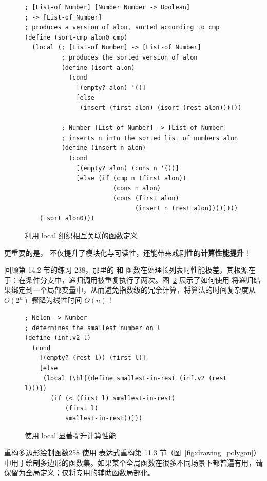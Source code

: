 \begin{figure}[htbp]
  \centering
\begin{lstlisting}[language=BSL, basicstyle=\scriptsize\ttfamily]
; [List-of Number] [Number Number -> Boolean]
; -> [List-of Number]
; produces a version of alon, sorted according to cmp
(define (sort-cmp alon0 cmp)
  (local (; [List-of Number] -> [List-of Number]
          ; produces the sorted version of alon
          (define (isort alon)
            (cond
              [(empty? alon) '()]
              [else
               (insert (first alon) (isort (rest alon)))]))

          ; Number [List-of Number] -> [List-of Number]
          ; inserts n into the sorted list of numbers alon
          (define (insert n alon)
            (cond
              [(empty? alon) (cons n '())]
              [else (if (cmp n (first alon))
                        (cons n alon)
                        (cons (first alon)
                              (insert n (rest alon))))])))
    (isort alon0)))
\end{lstlisting}
  \caption{利用 local 组织相互关联的函数定义}
  \label{fig:99}
\end{figure}

更重要的是， 不仅提升了模块化与可读性，还能带来戏剧性的\textbf{计算性能提升}！

回顾第 14.2 节的练习 238，那里的  和  函数在处理长列表时性能极差，其根源在于：在条件分支中，递归调用被重复执行了两次。图~\ref{fig:100} 展示了如何使用  将递归结果绑定到一个局部变量中，从而避免指数级的冗余计算，将算法的时间复杂度从 $O(2^n)$ 骤降为线性时间 $O(n)$！

\begin{figure}[htbp]
  \centering
\begin{stepperbox}[unbreakable]
\begin{Verbatim}[commandchars=\\\{\}, fontsize=\scriptsize]
; Nelon -> Number
; determines the smallest number on l
(define (inf.v2 l)
  (cond
    [(empty? (rest l)) (first l)]
    [else
     (local (\hl{(define smallest-in-rest (inf.v2 (rest l)))})
       (if (< (first l) smallest-in-rest)
           (first l)
           smallest-in-rest))]))
\end{Verbatim}
\end{stepperbox}
  \caption{使用 local 显著提升计算性能}
  \label{fig:100}
\end{figure}

\begin{exercise}{重构多边形绘制函数}{258}
使用  表达式重构第 11.3 节（图~\ref{fig:drawing_polygon}）中用于绘制多边形的函数集。如果某个全局函数在很多不同场景下都普遍有用，请保留为全局定义；仅将专用的辅助函数局部化。
\end{exercise}

